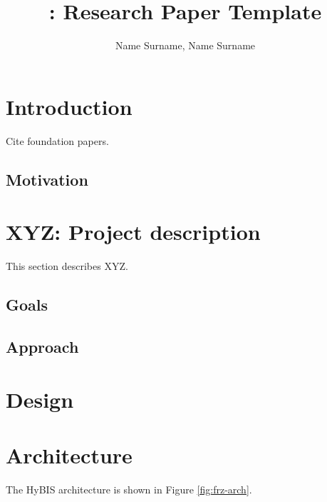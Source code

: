 \documentclass[10pt, journal, letterpaper]{article}
\title{\solname: Research Paper Template}
\author{Name Surname, Name Surname}
\newcommand{\solname}{XYZ\xspace}
\begin{document}
	\maketitle
		
	\begin{abstract}
	\lipsum[1-2]
	\end{abstract}
	
	\section{Introduction}
	\label{sect:intro}
	Cite foundation papers\cite{lamport1994latex}.
	\lipsum[3-4]
	
	\subsection{Motivation}
	\label{sect:motivation}
	\lipsum[5-6]
	
	\section{\solname: Project description}\label{sect:project}
	This section describes \solname.
	
	\subsection{Goals}
	\label{sect:goals}
	\lipsum[9]

	\subsection{Approach}
	\label{sect:approach}
	\lipsum[10]
		
	\section{Design}
	\label{sect:design}
	\lipsum[11]

	\section{Architecture}
	The HyBIS architecture is shown in Figure \ref{fig:frz-arch}.
	
\end{document}
